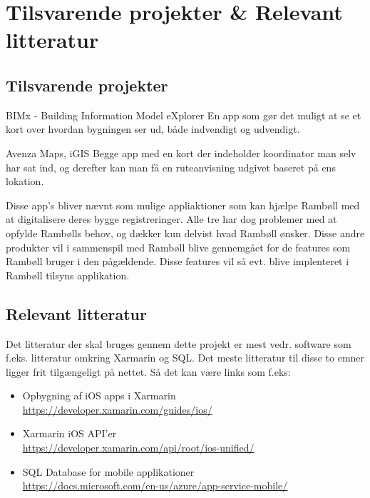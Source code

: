 \chapter{Tilsvarende projekter \& Relevant litteratur}
\section{Tilsvarende projekter}
BIMx - Building Information Model eXplorer
En app som gør det muligt at se et kort over hvordan bygningen ser ud, både indvendigt og udvendigt.

Avenza Maps, iGIS
Begge app med en kort der indeholder koordinator man selv har sat ind, og derefter kan man få en ruteanvisning udgivet baseret på ens lokation.

Disse app's bliver nævnt som mulige appliaktioner som kan hjælpe Rambøll med at digitalisere deres bygge registreringer. Alle tre har dog problemer med at opfylde Rambølls behov, og dækker kun delvist hvad Rambøll ønsker. \newline
Disse andre produkter vil i sammenspil med Rambøll blive gennemgået for de features som Rambøll bruger i den pågældende. Disse features vil så evt. blive implenteret i Rambøll tilsyns applikation. \\

\section{Relevant litteratur}
Det litteratur der skal bruges gennem dette projekt er mest vedr. software som f.eks. litteratur omkring Xarmarin og SQL.
Det meste litteratur til disse to emner ligger frit tilgængeligt på nettet. Så det kan være links som f.eks:
\begin{itemize}
	\item Opbygning af iOS apps i Xarmarin \\
	\url{https://developer.xamarin.com/guides/ios/}
	\item Xarmarin iOS API'er \\
	\url{https://developer.xamarin.com/api/root/ios-unified/}
	\item SQL Database for mobile applikationer \\
	\url{https://docs.microsoft.com/en-us/azure/app-service-mobile/}

\end{itemize} 


